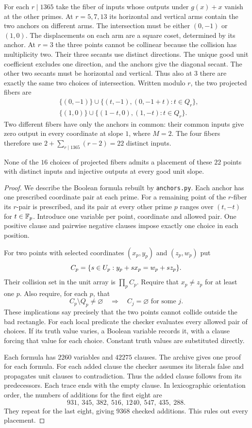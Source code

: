 For each $r\mid1365$ take the fiber of inputs whose outputs under $g(x)+x$ vanish at the other primes. At $r=5,7,13$ its horizontal and vertical arms contain the two anchors on different arms. The intersection must be either $(0,-1)$ or $(1,0)$. The displacements on each arm are a square coset, determined by its anchor. At $r=3$ the three points cannot be collinear because the collision has multiplicity two. Their three secants use distinct directions. The unique good unit coefficient excludes one direction, and the anchors give the diagonal secant. The other two secants must be horizontal and vertical. Thus also at $3$ there are exactly the same two choices of intersection. Written modulo $r$, the two projected fibers are
\begin{align*}
 &\{(0,-1)\}\cup\{(t,-1),(0,-1+t):t\in Q_r\},\\
 &\{(1,0)\}\cup\{(1-t,0),(1,-t):t\in Q_r\}.
\end{align*}
Two different fibers have only the anchors in common: their common inputs give zero output in every coordinate at slope $1$, where $M=2$. The four fibers therefore use $2+\sum_{r\mid1365}(r-2)=22$ distinct inputs.

\begin{lemma}\label{lem:rup}
None of the $16$ choices of projected fibers admits a placement of these $22$ points with distinct inputs and injective outputs at every good unit slope.
\end{lemma}
\begin{proof}
We describe the Boolean formula rebuilt by \texttt{anchors.py}. Each anchor has one prescribed coordinate pair at each prime. For a remaining point of the $r$-fiber its $r$-pair is prescribed, and its pair at every other prime $p$ ranges over $(t,-t)$ for $t\in\mathbb F_p$. Introduce one variable per point, coordinate and allowed pair. One positive clause and pairwise negative clauses impose exactly one choice in each position.

For two points with selected coordinates $(x_p,y_p)$ and $(z_p,w_p)$ put
\[
 C_p=\{s\in U_p:y_p+sx_p=w_p+sz_p\}.
\]
Their collision set in the unit array is $\prod_p C_p$. Require that $x_p\ne z_p$ for at least one $p$. Also require, for each $p$, that
\[
 C_p\setminus Q_p\ne\varnothing\quad\Longrightarrow\quad
 C_j=\varnothing\text{ for some }j.
\]
These implications say precisely that the two points cannot collide outside the bad rectangle. For each local predicate the checker evaluates every allowed pair of choices. If its truth value varies, a Boolean variable records it, with a clause forcing that value for each choice. Constant truth values are substituted directly.

Each formula has $2260$ variables and $42275$ clauses. The archive gives one proof for each formula. For each added clause the checker assumes its literals false and propagates unit clauses to contradiction. Thus the added clause follows from its predecessors. Each trace ends with the empty clause. In lexicographic orientation order, the numbers of additions for the first eight are
\[
 931,\ 345,\ 382,\ 516,\ 1240,\ 547,\ 435,\ 288.
\]
They repeat for the last eight, giving $9368$ checked additions. This rules out every placement.
\end{proof}

